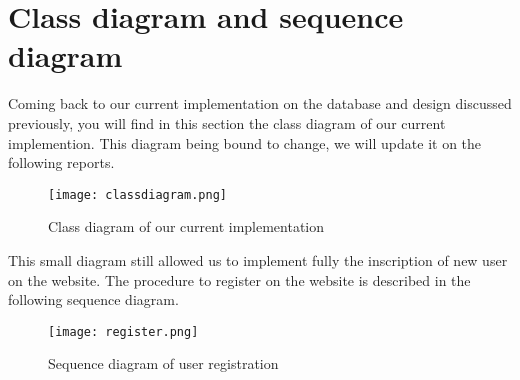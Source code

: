\section{Class diagram and sequence diagram}

Coming back to our current implementation on the database and design discussed previously, you will find in this section the class diagram of our current implemention. This diagram being bound to change, we will update it on the following reports.

\begin{figure}[!ht]
	\centering
	\texttt{[image: classdiagram.png]}
	\caption{Class diagram of our current implementation}
	\label{fig:length_eight_mouse}
\end{figure}
\FloatBarrier

This small diagram still allowed us to implement fully the inscription of new user on the website. The procedure to register on the website is described in the following sequence diagram.

\begin{figure}[!ht]
	\centering
	\texttt{[image: register.png]}
	\caption{Sequence diagram of user registration}
	\label{fig:length_eight_mouse}
\end{figure}
\FloatBarrier
